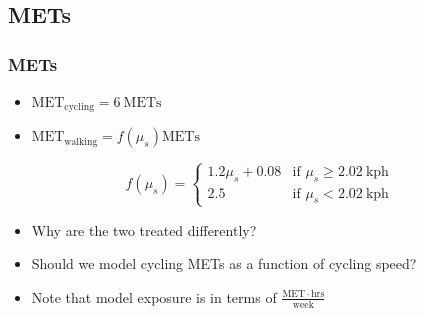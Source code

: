 \documentclass[handout,13pt,compress,c]{beamer}
\newcommand{\bi}{\begin{itemize}}
\newcommand{\ei}{\end{itemize}}
\begin{document}
\subsection{METs}
\begin{frame}[fragile]
\label{METs}
\frametitle{METs}
\bi
\item $\mathbf{\mathrm{MET}}_\mathrm{cycling} = 6\ \mathrm{METs}$
\item $\mathbf{\mathrm{MET}}_\mathrm{walking} = f\left( \mu_s  \right) \mathrm{METs}$
\ei
\begin{equation}
f(\mu_s) = \begin{cases} 1.2\mu_s + 0.08 &\mbox{if } \mu_s \ge 2.02\ \mathrm{kph} \\
2.5 & \mbox{if } \mu_s < 2.02\ \mathrm{kph}\end{cases}
\end{equation}
\bi
\item Why are the two treated differently?
\item Should we model cycling METs as a function of cycling speed?
\item Note that model exposure is in terms of $\frac{\mathrm{MET}\cdot\mathrm{hrs}}{\mathrm{week}}$
\ei
\end{frame}
\end{document}
